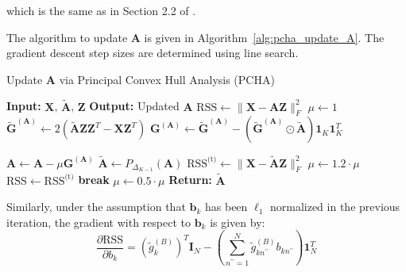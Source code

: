 \documentclass[oneside]{article}
\begin{document}
which is the same as in Section 2.2 of \autocite{morupArchetypalAnalysisMachine2012}.

The algorithm to update $\mathbf{A}$ is given in Algorithm~\ref{alg:pcha_update_A}. The gradient descent step sizes are determined using line search.

\begin{algorithm}[H]
    \caption{Update $\mathbf{A}$ via Principal Convex Hull Analysis (PCHA)}
    \label{alg:pcha_update_A}
    \begin{algorithmic}[1]
        \State \textbf{Input:} $\mathbf{X}$, $\tilde{\mathbf{A}}$, $\mathbf{Z}$
        \State \textbf{Output:} Updated $\mathbf{A}$
        \State $\text{RSS} \gets \| \mathbf{X} - \mathbf{A} \mathbf{Z} \|_F^2$
        \State $\mu \gets 1$
            \State $\tilde{\mathbf{G}}^{(\mathbf{A})} \gets 2 \left( \tilde{\mathbf{A}} \mathbf{Z} \mathbf{Z}^T - \mathbf{X} \mathbf{Z}^T \right)$
            \State $\mathbf{G}^{(\mathbf{A})} \gets \tilde{\mathbf{G}}^{(\mathbf{A})} - \left(\tilde{\mathbf{G}}^{(\mathbf{A})} \odot \tilde{\mathbf{A}} \right) \mathbf{1}_K \mathbf{1}_K^T$

             
                \State $\mathbf{A} \gets \mathbf{A} - \mu \mathbf{G}^{(\mathbf{A})}$
                \State $\tilde{\mathbf{A}} \gets P_{\Delta_{K-1}}(\mathbf{A})$
                \State $\text{RSS}^{\text{(t)}} \gets \| \mathbf{X} - \tilde{\mathbf{A}} \mathbf{Z} \|_F^2$
                    \State $\mu \gets 1.2 \cdot \mu$
                    \State $\text{RSS} \gets \text{RSS}^{\text{(t)}}$
                    \State \textbf{break}
                \Else
                    \State $\mu \gets 0.5 \cdot \mu$
                \EndIf
                \EndFor
        \EndFor
    \State \textbf{Return:} $\tilde{\mathbf{A}}$
    \end{algorithmic}
\end{algorithm}

Similarly, under the assumption that $\mathbf{b}_k$ has been $\ell_1$ normalized in the previous iteration, the gradient with respect to $\mathbf{b}_k$ is given by:
\begin{equation}
    \frac{\partial \text{RSS}}{\partial b_k} = \left( \tilde{g}^{(B)}_k \right)^T \mathbf{I}_N - \left( \sum_{n^{\prime \prime}=1}^N  \tilde{g}^{(B)}_{k n^{\prime \prime}} b_{kn^{\prime \prime}} \right) \mathbf{1}_N^T
\end{equation}
\end{document}
